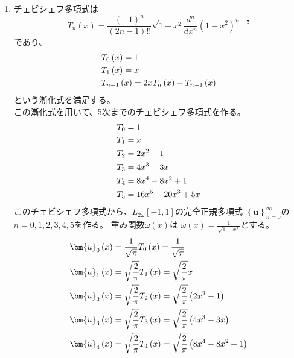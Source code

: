\begin{enumerate}
  \item チェビシェフ多項式は
  \begin{equation}\label{equation:4_1_a_1}
    T_{n} \left(x\right) = \frac{\left(-1\right)^{n}}{\left(2n -1\right)!!}
    \sqrt{1 - x^{2}} \frac{d^{n}}{dx^{n}} \left(1 - x^{2}\right)^{n - \frac{1}{2}}
  \end{equation}
  であり、
  \begin{align}\label{equation:4_1_a_2}
    & T_{0}\left(x\right) = 1 \notag \\
    & T_{1}\left(x\right) = x \notag \\
    & T_{n + 1}\left(x\right)
    = 2 x T_{n} \left(x\right) - T_{n - 1}\left(x\right)
  \end{align}
  という漸化式を満足する。\\
  この漸化式を用いて、5次までのチェビシェフ多項式を作る。
  \begin{align}\label{equation:4_1_a_3}
    & T_{0} = 1 \notag \\
    & T_{1} = x \notag \\
    & T_{2} = 2  x^{2} - 1 \notag \\
    & T_{3} = 4  x^{3} - 3  x \notag \\
    & T_{4} = 8  x^{4} - 8  x^{2} + 1 \notag \\
    & T_{5} = 16 x^{5} - 20 x^{3} + 5x
  \end{align}
  このチェビシェフ多項式から、\(L_{2 \omega} \left[-1,1\right]\)の完全正規多項式
  \(\left\{\bm{u}\right\}^{\infty}_{n = 0}\)の\(n = 0, 1, 2, 3, 4, 5\)を作る。
  重み関数\(\omega \left(x\right)\)は
  \(\omega \left(x\right) = \frac{1}{\sqrt{1 - x^{2}}}\)とする。
  \begin{align}\label{equation:4_1_a_4}
    & \bm{u}_{0} \left(x\right) = \frac{1}{\sqrt{\pi}} T_{0} \left(x\right) = \frac{1}{\sqrt{\pi}} \notag \\
    & \bm{u}_{1} \left(x\right) = \sqrt{\frac{2}{\pi}} T_{1} \left(x\right) = \sqrt{\frac{2}{\pi}} x \notag \\
    & \bm{u}_{2} \left(x\right) = \sqrt{\frac{2}{\pi}} T_{2} \left(x\right) = \sqrt{\frac{2}{\pi}} \left(2 x^{2} - 1\right) \notag \\
    & \bm{u}_{3} \left(x\right) = \sqrt{\frac{2}{\pi}} T_{3} \left(x\right) = \sqrt{\frac{2}{\pi}} \left(4 x^{3} - 3 x\right) \notag \\
    & \bm{u}_{4} \left(x\right) = \sqrt{\frac{2}{\pi}} T_{4} \left(x\right) = \sqrt{\frac{2}{\pi}} \left(8  x^{4} - 8  x^{2} + 1\right) \notag \\

\end{align}
\end{enumerate}
